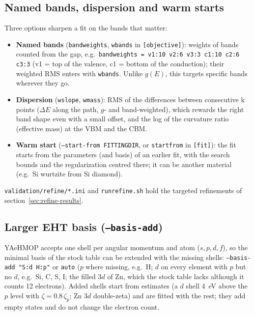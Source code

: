 \documentclass[11pt,a4paper]{article}
\newcommand{\cmd}[1]{\texttt{#1}}
\renewcommand{\_}{\origunderscore\allowbreak}
\begin{document}
\subsection{Named bands, dispersion and warm starts}\label{sec:refine}
Three options sharpen a fit on the bands that matter:
\begin{itemize}[nosep]
  \item \textbf{Named bands} (\cmd{band\_weights}, \cmd{w\_bands} in \cmd{[objective]}): weights of bands counted from
  the gap, e.g.\ \cmd{band\_weights = v1:10 v2:6 v3:3 c1:10 c2:6 c3:3} (v1 = top of the valence, c1 = bottom of the
  conduction); their weighted RMS enters with \cmd{w\_bands}. Unlike $g(E)$, this targets specific bands wherever they go.
  \item \textbf{Dispersion} (\cmd{w\_slope}, \cmd{w\_mass}): RMS of the differences between consecutive k points
  ($\Delta E$ along the path, $g$- and band-weighted), which rewards the right band shape even with a small offset, and
  the log of the curvature ratio (effective mass) at the VBM and the CBM.
  \item \textbf{Warm start} (\cmd{--start-from FITTINGDIR}, or \cmd{start\_from} in \cmd{[fit]}): the fit starts from
  the parameters (and basis) of an earlier fit, with the search bounds and the regularization centred there; it can be
  another material (e.g.\ Si wurtzite from Si diamond).
\end{itemize}
\cmd{validation/refine/*.ini} and \cmd{run\_refine.sh} hold the targeted refinements of section~\ref{sec:refine-results}.

\subsection{Larger EHT basis (\cmd{--basis-add})}
YAeHMOP accepts one shell per angular momentum and atom ($s,p,d,f$), so the minimal basis of the stock table can be
extended with the missing shells: \cmd{--basis-add "S:d H:p"} or \cmd{auto} ($p$ where missing, e.g.\ H; $d$ on every
element with $p$ but no $d$, e.g.\ Si, C, S, I; the filled $3d$ of Zn, which the stock table lacks although it counts
12 electrons). Added shells start from estimates (a $d$ shell 4~eV above the $p$ level with $\zeta=0.8\,\zeta_p$; Zn $3d$
double-zeta) and are fitted with the rest; they add empty states and do not change the electron count.
\end{document}
